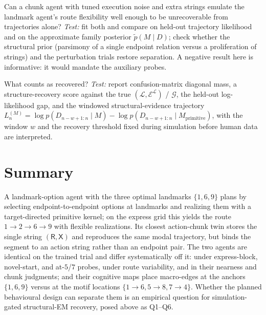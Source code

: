 \documentclass[11pt]{article}
\begin{document}
\begin{description}[leftmargin=1.6em,style=nextline]
\item[Q5. Identifiability boundary (the mimicry risk).] Can a chunk agent with tuned
execution noise and extra strings emulate the landmark agent's route flexibility well
enough to be unrecoverable from trajectories alone?
\emph{Test:} fit both and compare on held-out trajectory likelihood and on the approximate
family posterior $\widetilde p(M\mid D)$; check whether the structural prior (parsimony of a
single endpoint relation versus a proliferation of strings) and the perturbation trials
restore separation. A negative result here is informative: it would mandate the auxiliary
probes.
\item[Q6. Metrics and thresholds.] What counts as recovered?
\emph{Test:} report confusion-matrix diagonal mass, a structure-recovery score against the
true $(\mathcal L,\mathcal E^{\mathcal L})$ / $\mathcal G$, the held-out log-likelihood gap,
and the windowed structural-evidence trajectory
$L_n^{(M)}=\log p(D_{n-w+1:n}\mid M)-\log p(D_{n-w+1:n}\mid M_{\mathrm{primitive}})$,
with the window $w$ and the recovery threshold fixed during simulation before human data
are interpreted.
\end{description}

\section{Summary}

A landmark-option agent with the three optimal landmarks $\{1,6,9\}$ plans by selecting
endpoint-to-endpoint options at landmarks and realizing them with a target-directed
primitive kernel; on the express grid this yields the route $1\to2\to6\to9$ with flexible
realizations. Its closest action-chunk twin stores the single string $(\mathsf R,\mathsf X)$
and reproduces the same modal trajectory, but binds the segment to an action string rather
than an endpoint pair. The two agents are identical on the trained trial and differ
systematically off it: under express-block, novel-start, and at-$5$/$7$ probes, under route
variability, and in their nearness and chunk judgments; and their cognitive maps place
macro-edges at the anchors $\{1,6,9\}$ versus at the motif locations $\{1\!\to\!6,5\!\to\!8,
7\!\to\!4\}$. Whether the planned behavioural design can separate them is an empirical
question for simulation-gated structural-EM recovery, posed above as Q1--Q6.
\end{document}
